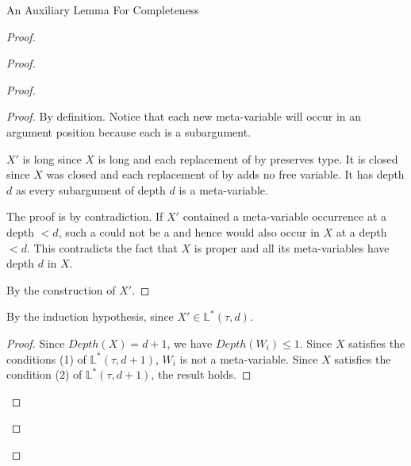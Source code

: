 \begin{frame}[allowframebreaks]{An Auxiliary Lemma For Completeness}
\begin{proof}
\begin{proof}
\begin{proof}
\framebreak

\begin{proof}
By definition. Notice that each new meta-variable  will occur in an argument position because each  is a subargument.

\medskip

$X'$ is long since $X$ is long and each replacement of  by  preserves type. It is closed since $X$ was closed and each replacement of  by  adds no free variable. It has depth $d$ as every subargument of depth $d$ is a meta-variable.

\medskip

The proof is by contradiction. If $X'$ contained a meta-variable occurrence  at a depth $< d$, such a  could not be a  and hence would also occur in $X$ at a depth $< d$. This contradicts the fact that $X$ is proper and all its meta-variables have depth $d$ in $X$. 

\medskip

By the construction of $X'$. 

\end{proof}

By the induction hypothesis, since $X' \in \mathbb{L}^{*}(\tau, d)$.

\medskip

\begin{proof} 
Since $Depth(X) = d+1$, we have $Depth(W_i) \le 1$. Since $X$ satisfies the conditions (1) of $\mathbb{L}^{*}(\tau, d+1)$, $W_i$ is not a meta-variable. Since $X$ satisfies the condition (2) of $\mathbb{L}^{*}(\tau, d+1)$, the result holds. 

\medskip

\end{proof} 


\end{proof}
\end{proof}
\end{proof}
\end{frame}
